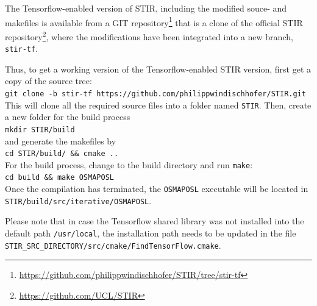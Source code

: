\documentclass[a4paper, 11pt]{article}
\begin{document}
  The Tensorflow-enabled version of STIR, including the modified souce- and makefiles is available from a GIT repository\footnote{\url{https://github.com/philippwindischhofer/STIR/tree/stir-tf}} that is a clone of the official STIR repository\footnote{\url{https://github.com/UCL/STIR}}, where the modifications have been integrated into a new branch, \texttt{stir-tf}.

  Thus, to get a working version of the Tensorflow-enabled STIR version, first get a copy of the source tree:\\
  \texttt{git clone -b stir-tf https://github.com/philippwindischhofer/STIR.git}\\
  This will clone all the required source files into a folder named \texttt{STIR}. Then, create a new folder for the build process\\
  \texttt{mkdir STIR/build}\\
  and generate the makefiles by\\
  \texttt{cd STIR/build/ \&\& cmake ..}\\
  For the build process, change to the build directory and run \texttt{make}:\\
  \texttt{cd build \&\& make OSMAPOSL}\\

  Once the compilation has terminated, the \texttt{OSMAPOSL} executable will be located in \texttt{STIR/build/src\-/iterative/OSMAPOSL}.  
  
   Please note that in case the Tensorflow shared library was not installed into the default path \texttt{/usr/local}, the installation path needs to be updated in the file \texttt{STIR\_SRC\_DIRECTORY/src/cmake\-/FindTensorFlow.cmake}.
\end{document}
